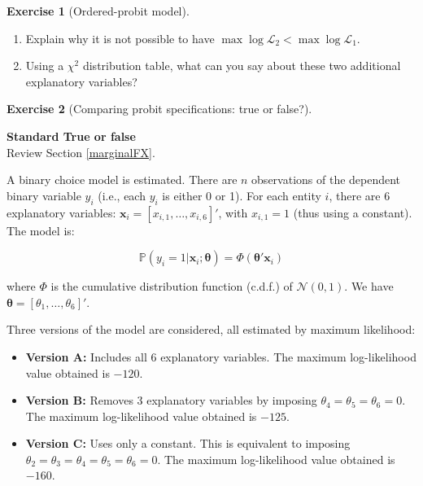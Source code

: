 \documentclass[
  11pt,
]{book}
\theoremstyle{definition}
\theoremstyle{definition}
\theoremstyle{definition}
\newtheorem{exercise}{Exercise}[chapter]
\theoremstyle{definition}
\theoremstyle{remark}
\begin{document}
\begin{exercisebox}
\begin{exercise}[Ordered-probit model]
\begin{enumerate}
\def\labelenumi{\arabic{enumi}.}
\setcounter{enumi}{7}
\item
  Explain why it is not possible to have \(\max \log \mathcal{L}_2 < \max \log \mathcal{L}_1\).
\item
  Using a \(\chi^2\) distribution table, what can you say about these two additional explanatory variables?
\end{enumerate}

\end{exercise}

\end{exercisebox}


\begin{exercisebox}

\begin{exercise}[Comparing probit specifications: true or false?]
\protect\hypertarget{exr:binary-probit-models-true-false}{}\label{exr:binary-probit-models-true-false}

\textbf{Standard \textbar{} True or false}\\
Review Section \ref{marginalFX}.

A binary choice model is estimated. There are \(n\) observations of the dependent binary variable \(y_i\) (i.e., each \(y_i\) is either 0 or 1). For each entity \(i\), there are 6 explanatory variables: \(\mathbf{x}_i = [x_{i,1}, \dots, x_{i,6}]'\), with \(x_{i,1} = 1\) (thus using a constant). The model is:

\[\mathbb{P}(y_i = 1 | \mathbf{x}_i; \boldsymbol{\theta}) = \Phi(\boldsymbol{\theta}'\mathbf{x}_i)\]

where \(\Phi\) is the cumulative distribution function (c.d.f.) of \(\mathcal{N}(0, 1)\). We have \(\boldsymbol{\theta} = [\theta_1, \dots, \theta_6]'\).

Three versions of the model are considered, all estimated by maximum likelihood:

\begin{itemize}
\item
  \textbf{Version A:} Includes all 6 explanatory variables. The maximum log-likelihood value obtained is \(-120\).
\item
  \textbf{Version B:} Removes 3 explanatory variables by imposing \(\theta_4 = \theta_5 = \theta_6 = 0\). The maximum log-likelihood value obtained is \(-125\).
\item
  \textbf{Version C:} Uses only a constant. This is equivalent to imposing \(\theta_2 = \theta_3 = \theta_4 = \theta_5 = \theta_6 = 0\). The maximum log-likelihood value obtained is \(-160\).
\end{itemize}


\end{exercise}
\end{exercisebox}
\end{document}
